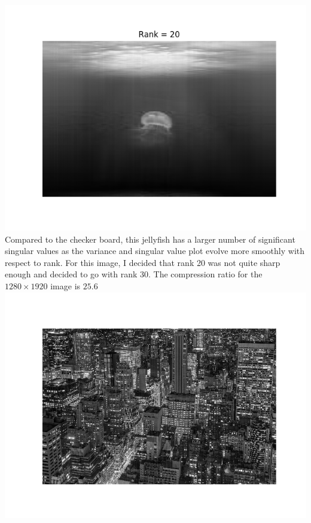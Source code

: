 \documentclass[11pt]{article}
\begin{document}
\begin{enumerate}
\includegraphics[scale=.55]{jelly_compress_20.png}\\
Compared to the checker board, this jellyfish has a larger number of significant singular values as the variance and singular value plot evolve more smoothly with respect to rank. For this image, I decided that rank 20 was not quite sharp enough and decided to go with rank 30. The compression ratio for the $1280 \times 1920$ image is $25.6$\\
\includegraphics[scale=.55]{ny_g.png}

\end{enumerate}
\end{document}
